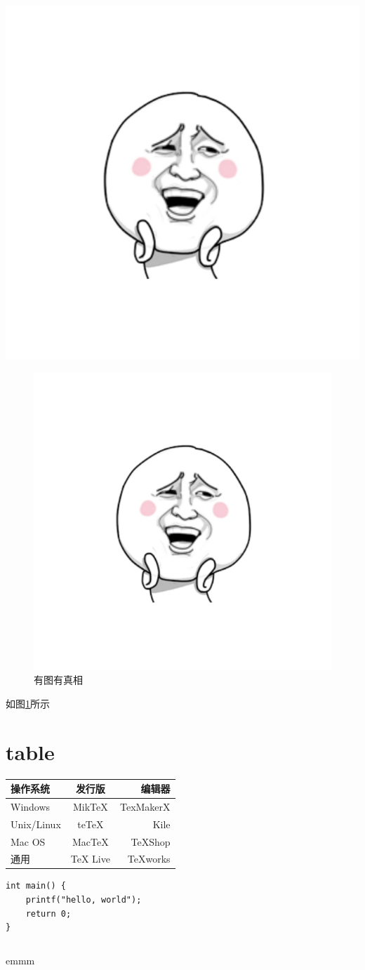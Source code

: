 \documentclass[UTF8]{ctexart}
\begin{document}
\includegraphics[width = .8\textwidth]{a.png}

\begin{figure}[htbp]
\centering
\includegraphics[width = .8\textwidth]{a.png}
\caption{有图有真相}
\label{a}
\end{figure}

如图\ref{a}所示

\section{table}

\begin{tabular}{|l|c|r|}
 \hline
操作系统& 发行版& 编辑器\\
 \hline
Windows & MikTeX & TexMakerX \\
 \hline
Unix/Linux & teTeX & Kile \\
 \hline
Mac OS & MacTeX & TeXShop \\
 \hline
通用& TeX Live & TeXworks \\
 \hline
\end{tabular}

\begin{verbatim}  
int main() {  
    printf("hello, world");  
    return 0;  
}  
\end{verbatim}  

\inputminted{python}{code/1.py}

emmm

%
\end{document}
